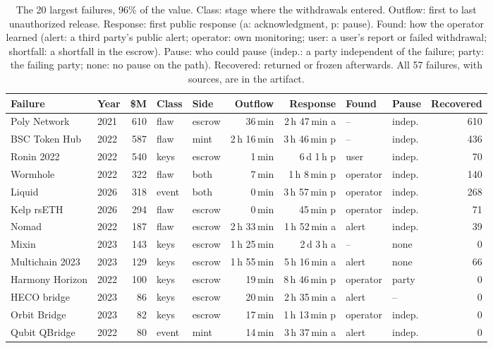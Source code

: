 \begin{table}[t]
\centering
\caption{The 20 largest failures, 96\% of the value. Class: stage where the withdrawals entered. Outflow: first to last unauthorized release. Response: first public response (a: acknowledgment, p: pause). Found: how the operator learned (alert: a third party's public alert; operator: own monitoring; user: a user's report or failed withdrawal; shortfall: a shortfall in the escrow). Pause: who could pause (indep.: a party independent of the failure; party: the failing party; none: no pause on the path). Recovered: returned or frozen afterwards. All 57 failures, with sources, are in the artifact.}
\label{tab:failures}
\scriptsize
\setlength{\tabcolsep}{3pt}
\begin{tabular}{@{}l l r l l r r l l r@{}}
\toprule
Failure & Year & \$M & Class & Side & Outflow & Response & Found & Pause & Recovered \\
\midrule
Poly Network & 2021 & 610 & flaw & escrow & 36\,min & 2\,h 47\,min a & -- & indep. & 610 \\
BSC Token Hub & 2022 & 587 & flaw & mint & 2\,h 16\,min & 3\,h 46\,min p & -- & indep. & 436 \\
Ronin 2022 & 2022 & 540 & keys & escrow & 1\,min & 6\,d 1\,h p & user & indep. & 70 \\
Wormhole & 2022 & 322 & flaw & both & 7\,min & 1\,h 8\,min p & operator & indep. & 140 \\
Liquid & 2026 & 318 & event & both & 0\,min & 3\,h 57\,min p & operator & indep. & 268 \\
Kelp rsETH & 2026 & 294 & flaw & escrow & 0\,min & 45\,min p & operator & indep. & 71 \\
Nomad & 2022 & 187 & flaw & escrow & 2\,h 33\,min & 1\,h 52\,min a & alert & indep. & 39 \\
Mixin & 2023 & 143 & keys & escrow & 1\,h 25\,min & 2\,d 3\,h a & -- & none & 0 \\
Multichain 2023 & 2023 & 129 & keys & escrow & 1\,h 55\,min & 5\,h 16\,min a & alert & none & 66 \\
Harmony Horizon & 2022 & 100 & keys & escrow & 19\,min & 8\,h 46\,min p & operator & party & 0 \\
HECO bridge & 2023 & 86 & keys & escrow & 20\,min & 2\,h 35\,min a & alert & -- & 0 \\
Orbit Bridge & 2023 & 82 & keys & escrow & 17\,min & 1\,h 13\,min p & operator & indep. & 0 \\
Qubit QBridge & 2022 & 80 & event & mint & 14\,min & 3\,h 37\,min a & alert & indep. & 0 \\

\end{tabular}
\end{table}
